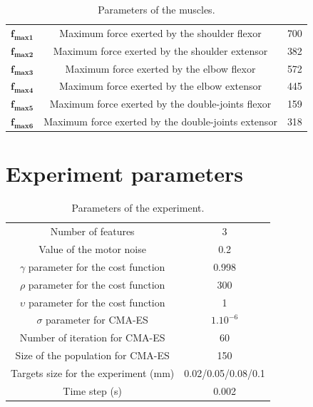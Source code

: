 \documentclass[pdftex,a4paper,12pt]{report}
\begin{document}
\begin{table}[hbt]
\caption{Parameters of the muscles.}
\begin{center}
\begin{tabular}{|c|c|c|}
\hline  
$\textbf{f}_{\textbf{max1}}$ & Maximum force exerted by the shoulder flexor & 700\\
$\textbf{f}_{\textbf{max2}}$ & Maximum force exerted by the shoulder extensor & 382\\
$\textbf{f}_{\textbf{max3}}$ & Maximum force exerted by the elbow flexor & 572\\
$\textbf{f}_{\textbf{max4}}$ & Maximum force exerted by the elbow extensor & 445\\
$\textbf{f}_{\textbf{max5}}$ & Maximum force exerted by the double-joints flexor & 159\\
$\textbf{f}_{\textbf{max6}}$ & Maximum force exerted by the double-joints extensor & 318\\
\hline
\end{tabular}
\end{center}
\label{MuscleParamTable}
\end{table}

\pagebreak
\section{Experiment parameters}
\label{sec_expParam}
\begin{table}[hbt]
\caption{Parameters of the experiment.}
\begin{center}
\begin{tabular}{|c|c|}
\hline  
Number of features & 3\\
Value of the motor noise & 0.2\\
$\gamma$ parameter for the cost function & 0.998\\
$\rho$ parameter for the cost function & 300\\
$\upsilon$ parameter for the cost function & 1\\
$\sigma$ parameter for CMA-ES & $1.10^{-6}$\\
Number of iteration for CMA-ES & 60 \\
Size of the population for CMA-ES & 150 \\
Targets size for the experiment (mm) & 0.02/0.05/0.08/0.1 \\
Time step (s) & 0.002 \\
\hline
\end{tabular}
\end{center}
\label{tab_ExperimentParam}
\end{table}
\end{document}
